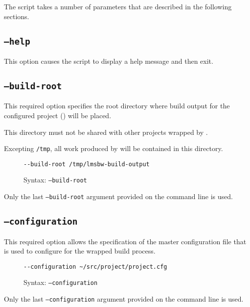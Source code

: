 The \lmsbwcmd script takes a number of parameters that are described
in the following sections.

\subsection{\texttt{--help}}

This option causes the script to display a help message and then exit.

\subsection{\texttt{--build-root}}\label{usinglmsbw:build-root}

This required option specifies the root directory where build output
for the configured project () will be
placed.

This directory must not be shared with other projects wrapped by
\lmsbw.

Excepting \texttt{/tmp}, all work produced by \lmsbw will be contained
in this directory.

\begin{figure}[h]
  \hrulefill
\begin{verbatim}
--build-root /tmp/lmsbw-build-output
\end{verbatim}
  \caption{Syntax: \texttt{--build-root}}
  \hrulefill
\end{figure}


Only the last \texttt{--build-root} argument provided on the command
line is used.

\subsection{\texttt{--configuration}}\label{usinglmsbw:configuration}

This required option allows the specification of the master
configuration file that is used to configure \lmsbw for the wrapped
build process.

\begin{figure}[h]
  \hrulefill
\begin{verbatim}
--configuration ~/src/project/project.cfg
\end{verbatim}
  \caption{Syntax: \texttt{--configuration}}
  \hrulefill
\end{figure}

Only the last \texttt{--configuration} argument provided on the
command line is used.

